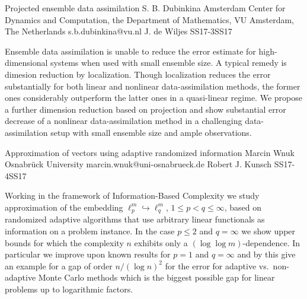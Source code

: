 \begin{talk}
  {Projected ensemble data assimilation}%
  {S. B. Dubinkina }%
  {Amsterdam Center for Dynamics and Computation, the Department of Mathematics, VU Amsterdam, The Netherlands}%
  {s.b.dubinkina@vu.nl}%
  {J. de Wiljes}%
{}{}{SS17-3}{SS17}

			
Ensemble data assimilation is unable to reduce the error estimate for high-dimensional systems when used with small ensemble size. A typical remedy is dimesion reduction by localization. Though localization reduces the error substantially for both linear and nonlinear data-assimilation methods, the former ones considerably outperform the latter ones in a quasi-linear regime. We propose a further dimension reduction based on projection and show substantial error decrease of a nonlinear data-assimilation method in a challenging data-assimilation setup with small ensemble size and ample observations.  

\medskip

\end{talk}

\begin{talk}
{Approximation of vectors using adaptive randomized information}
{Marcin Wnuk}
{Osnabr\"uck University}
{marcin.wnuk@uni-osnabrueck.de}
{Robert J. Kunsch}
{}{}{SS17-4}{SS17}



Working in the framework of Information-Based Complexity we study approximation of the embedding $\ell_p^m \hookrightarrow \ell_q^m$, $1 \leq p < q \leq \infty$,
based on randomized adaptive algorithms that use arbitrary linear 
functionals as information on a problem instance.
In the case $p \leq 2$ and $q = \infty$
we show upper bounds for which the complexity $n$ 
exhibits only a $(\log\log m)$-dependence. 
In particular we improve upon known results for $p=1$ and $q=\infty$
and by this give an example for a gap of order $n / (\log n)^2$
for the error for adaptive vs.\ non-adaptive Monte Carlo methods
which is the biggest possible gap for linear problems up to logarithmic factors.

\end{talk}


